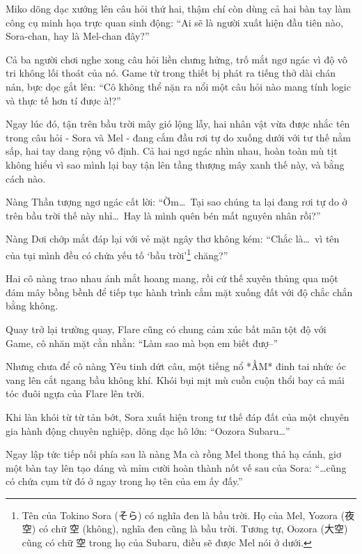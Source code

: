 \documentclass[../main.tex]{subfiles}
\begin{document}
Miko dõng dạc xướng lên câu hỏi thứ hai, thậm chí còn dùng cả hai bàn tay làm công cụ minh họa trực quan sinh động: ``Ai sẽ là người xuất hiện đầu tiên nào, Sora-chan, hay là Mel-chan đây?''

Cả ba người chơi nghe xong câu hỏi liền chưng hửng, trố mắt ngơ ngác vì độ vô tri không lối thoát của nó. Game từ trong thiết bị phát ra tiếng thở dài chán nản, bực dọc gắt lên: ``Cô không thể nặn ra nổi một câu hỏi nào mang tính logic và thực tế hơn tí được à!?''

Ngay lúc đó, tận trên bầu trời mây gió lộng lẫy, hai nhân vật vừa được nhắc tên trong câu hỏi - Sora và Mel - đang cắm đầu rơi tự do xuống dưới với tư thế nằm sấp, hai tay dang rộng vô định. Cả hai ngơ ngác nhìn nhau, hoàn toàn mù tịt không hiểu vì sao mình lại bay tận lên tầng thượng mây xanh thế này, và bằng cách nào.


Nàng Thần tượng ngơ ngác cất lời: ``Ờm\dots\ Tại sao chúng ta lại đang rơi tự do ở trên bầu trời thế này nhỉ\dots\ Hay là mình quên bén mất nguyên nhân rồi?''

Nàng Dơi chớp mắt đáp lại với vẻ mặt ngây thơ không kém: ``Chắc là\dots\ vì tên của tụi mình đều có chứa yếu tố `bầu trời'\footnote{Tên của Tokino Sora (そら) có nghĩa đen là bầu trời. Họ của Mel, Yozora (夜空) có chữ 空 (không), nghĩa đen cũng là bầu trời. Tương tự, Oozora (大空) cũng có chữ 空 trong họ của Subaru, điều sẽ được Mel nói ở dưới.} chăng?''

Hai cô nàng trao nhau ánh mắt hoang mang, rồi cứ thế xuyên thủng qua một đám mây bồng bềnh để tiếp tục hành trình cắm mặt xuống đất với độ chắc chắn bằng không.

Quay trở lại trường quay, Flare cũng có chung cảm xúc bất mãn tột độ với Game, cô nhăn mặt cằn nhằn: ``Làm sao mà bọn em biết đượ--''


Nhưng chưa để cô nàng Yêu tinh dứt câu, một tiếng nổ *ẦM* đinh tai nhức óc vang lên cắt ngang bầu không khí. Khói bụi mịt mù cuồn cuộn thổi bay cả mái tóc đuôi ngựa của Flare lên trời.

Khi làn khói từ từ tản bớt, Sora xuất hiện trong tư thế đáp đất của một chuyên gia hành động chuyên nghiệp, dõng dạc hô lớn: ``Oozora Subaru\dots''

Ngay lập tức tiếp nối phía sau là nàng Ma cà rồng Mel thong thả hạ cánh, giơ một bàn tay lên tạo dáng và mỉm cười hoàn thành nốt vế sau của Sora: ``\dots cũng có chứa cụm từ đó ở ngay trong họ tên của em ấy đấy.''
\end{document}
